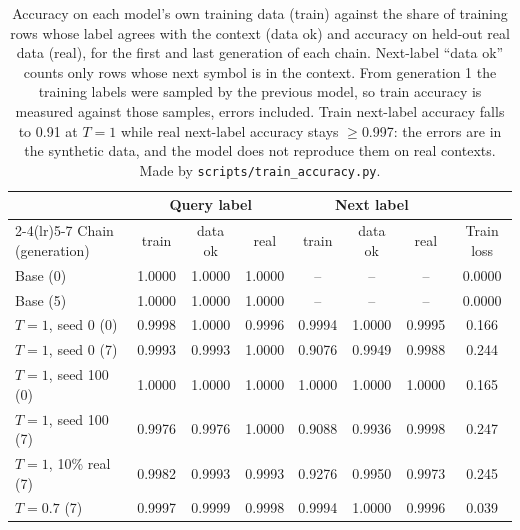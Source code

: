 \documentclass[10pt,letterpaper]{article}
\begin{document}
\begin{table}[H]
\centering
\caption{ Accuracy on each model's own training data (train) against the share of training rows whose label agrees with the context (data ok) and accuracy on held-out real data (real), for the first and last generation of each chain. Next-label ``data ok'' counts only rows whose next symbol is in the context. From generation 1 the training labels were sampled by the previous model, so train accuracy is measured against those samples, errors included. Train next-label accuracy falls to 0.91 at $T{=}1$ while real next-label accuracy stays $\geq$0.997: the errors are in the synthetic data, and the model does not reproduce them on real contexts. Made by \texttt{scripts/train\_accuracy.py}.}
\small
\begin{tabular}{@{}lccccccc@{}}
\toprule
& \multicolumn{3}{c}{Query label} & \multicolumn{3}{c}{Next label} & \\
\cmidrule(lr){2-4}\cmidrule(lr){5-7}
Chain (generation) & train & data ok & real & train & data ok & real & Train loss \\
\midrule
Base (0) & 1.0000 & 1.0000 & 1.0000 & -- & -- & -- & 0.0000 \\
Base (5) & 1.0000 & 1.0000 & 1.0000 & -- & -- & -- & 0.0000 \\
$T{=}1$, seed 0 (0) & 0.9998 & 1.0000 & 0.9996 & 0.9994 & 1.0000 & 0.9995 & 0.166 \\
$T{=}1$, seed 0 (7) & 0.9993 & 0.9993 & 1.0000 & 0.9076 & 0.9949 & 0.9988 & 0.244 \\
$T{=}1$, seed 100 (0) & 1.0000 & 1.0000 & 1.0000 & 1.0000 & 1.0000 & 1.0000 & 0.165 \\
$T{=}1$, seed 100 (7) & 0.9976 & 0.9976 & 1.0000 & 0.9088 & 0.9936 & 0.9998 & 0.247 \\
$T{=}1$, 10\% real (7) & 0.9982 & 0.9993 & 0.9993 & 0.9276 & 0.9950 & 0.9973 & 0.245 \\
$T{=}0.7$ (7) & 0.9997 & 0.9999 & 0.9998 & 0.9994 & 1.0000 & 0.9996 & 0.039 \\
\bottomrule
\end{tabular}
\label{tab:train}
\end{table}
\end{document}
